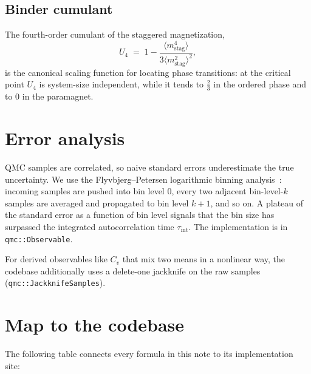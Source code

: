 \documentclass[11pt,a4paper]{article}
\newcommand{\stagm}{m_{\text{stag}}}
\theoremstyle{definition}
\theoremstyle{plain}
\begin{document}
\subsection{Binder cumulant}
The fourth-order cumulant of the staggered magnetization,
\begin{equation}\label{eq:binder}
    U_4 \;=\; 1 - \frac{\langle \stagm^4\rangle}{3\langle \stagm^2\rangle^2},
\end{equation}
is the canonical scaling function for locating phase transitions: at
the critical point $U_4$ is system-size independent, while it tends
to $\tfrac23$ in the ordered phase and to $0$ in the paramagnet.

\section{Error analysis}\label{sec:errors}
QMC samples are correlated, so naive standard errors underestimate
the true uncertainty. We use the Flyvbjerg--Petersen logarithmic
binning analysis~\cite{flyvbjerg1989}: incoming samples are pushed
into bin level $0$, every two adjacent bin-level-$k$ samples are
averaged and propagated to bin level $k+1$, and so on. A plateau of
the standard error as a function of bin level signals that the bin
size has surpassed the integrated autocorrelation time
$\tau_{\text{int}}$. The implementation is in
\lstinline|qmc::Observable|.

For derived observables like $C_v$ that mix two means in a nonlinear
way, the codebase additionally uses a delete-one jackknife on the
raw samples (\lstinline|qmc::JackknifeSamples|).

\section{Map to the codebase}\label{sec:code}
The following table connects every formula in this note to its
implementation site:
\end{document}
